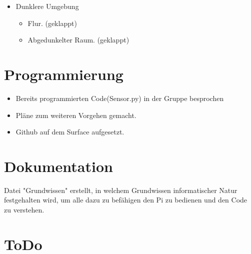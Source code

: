 \documentclass{article}
\begin{document}
\begin{itemize}

\item Dunklere Umgebung 
\begin{itemize}

\item Flur. (geklappt)

\item Abgedunkelter Raum. (geklappt)

\end{itemize}

\end{itemize}

\section{Programmierung}

\begin{itemize}

\item Bereits programmierten Code(Sensor.py) in der Gruppe besprochen 

\item Pl\"{a}ne zum weiteren Vorgehen gemacht.

\item Github auf dem Surface aufgesetzt.

\end{itemize}

\section{Dokumentation}

Datei "Grundwissen" erstellt, in welchem Grundwissen informatischer Natur festgehalten wird, um alle dazu zu bef\"{a}higen den Pi zu bedienen und den Code zu verstehen.

\section{ToDo}
\end{document}

